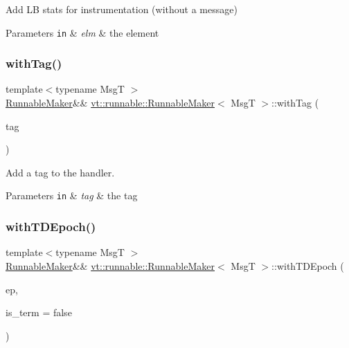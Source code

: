 Add LB stats for instrumentation (without a message) 


\begin{DoxyParams}[1]{Parameters}
\mbox{\tt in}  & {\em elm} & the element \\
\hline
\end{DoxyParams}
\mbox{\label{structvt_1_1runnable_1_1_runnable_maker_a3a22a3b3952eb54f07e610000f833d7e}} 
\subsubsection{\texorpdfstring{with\+Tag()}{withTag()}}
{\footnotesize\ttfamily template$<$typename MsgT $>$ \\
\hyperlink{structvt_1_1runnable_1_1_runnable_maker}{Runnable\+Maker}\&\& \hyperlink{structvt_1_1runnable_1_1_runnable_maker}{vt\+::runnable\+::\+Runnable\+Maker}$<$ MsgT $>$\+::with\+Tag (\begin{DoxyParamCaption}\item[{\hyperlink{namespacevt_a84ab281dae04a52a4b243d6bf62d0e52}{Tag\+Type}}]{tag }\end{DoxyParamCaption})\hspace{0.3cm}{\ttfamily [inline]}}



Add a tag to the handler. 


\begin{DoxyParams}[1]{Parameters}
\mbox{\tt in}  & {\em tag} & the tag \\
\hline
\end{DoxyParams}
\mbox{\label{structvt_1_1runnable_1_1_runnable_maker_a60b98132fcf31de89854ca70c087eb0e}} 
\subsubsection{\texorpdfstring{with\+T\+D\+Epoch()}{withTDEpoch()}}
{\footnotesize\ttfamily template$<$typename MsgT $>$ \\
\hyperlink{structvt_1_1runnable_1_1_runnable_maker}{Runnable\+Maker}\&\& \hyperlink{structvt_1_1runnable_1_1_runnable_maker}{vt\+::runnable\+::\+Runnable\+Maker}$<$ MsgT $>$\+::with\+T\+D\+Epoch (\begin{DoxyParamCaption}\item[{\hyperlink{namespacevt_a81d11b28122d43bf9834577e4a06440f}{Epoch\+Type}}]{ep,  }\item[{bool}]{is\+\_\+term = {\ttfamily false} }\end{DoxyParamCaption})\hspace{0.3cm}{\ttfamily [inline]}}



